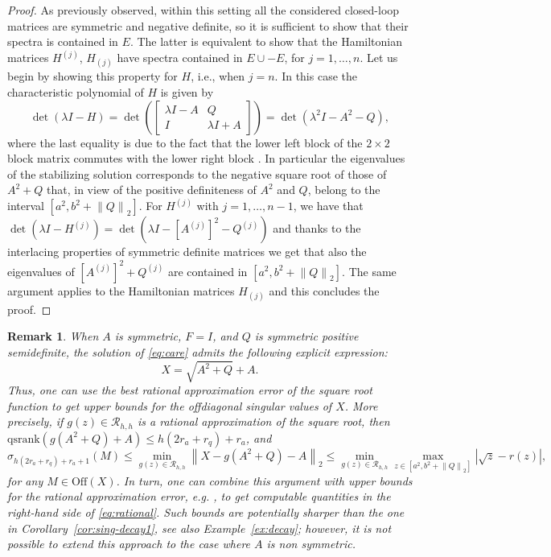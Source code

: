 \documentclass[a4paper,10pt]{article}
\def\qsrank{\mathrm{qsrank}}
\newcommand{\norm}[1]{\left\lVert#1\right\rVert}
\newtheorem{remark}{Remark}
\newcommand{\upd}[1]{{\color{black}#1}} %
\begin{document}
\begin{proof}
	As previously observed, within this setting all the considered closed-loop matrices are symmetric and negative definite, so it is sufficient to show that their spectra is contained in $E$. The latter is equivalent to show that the Hamiltonian matrices $H^{(j)}$, $H_{(j)}$ have spectra contained in $E\cup -E$, for $j=1,\dots, n$. Let us begin by showing this property for $H$, i.e., when $j=n$. In this case the characteristic polynomial of $H$ is given by
	$$
	\det(\lambda I -H)= \det\left(\begin{bmatrix}
		\lambda I - A&Q\\
		I &\lambda I +A
	\end{bmatrix}\right) = \det(\lambda^2 I -A^2-Q),
	$$
	where the last equality is due to the fact that the lower left block of the $2\times 2$ block matrix commutes with the lower right block \cite{silvester2000determinants}. In particular the eigenvalues of the stabilizing solution corresponds to the negative square root of those of $A^2 + Q$ that, in view of the positive definiteness of $A^2$ and $Q$, belong to the interval $[a^2 , b^2 + \norm{Q}_2]$. For $H^{(j)}$ with $j=1,\dots, n-1$, we have that $\det (\lambda I-H^{(j)})= \det(\lambda I- [A^{(j)}]^2-Q^{(j)})$ and thanks to the interlacing properties of symmetric definite matrices we get that also the eigenvalues of 
	$[A^{(j)}]^2+Q^{(j)}$ are contained in $[a^2 , b^2 + \norm{Q}_2]$. The same argument applies to the Hamiltonian matrices $H_{(j)}$ and this concludes the proof.
\end{proof}
\begin{remark}\label{rem:rational}
 When $A$ is symmetric, $F=I$, and $Q$ is symmetric positive semidefinite, the solution of \eqref{eq:care} admits the following explicit expression:
 \begin{equation}\label{eq:caresol}
 	X = \sqrt{A^2+Q}+A.	
 \end{equation} 
Thus, one can use the best rational approximation error of the square root function to get upper bounds for the offdiagonal singular values of $X$. More precisely\upd{,} if $g(z)\in\mathcal R_{h,h}$ is a rational approximation of the square root, then $\qsrank(g(A^2+Q)+A)\le h(2r_a+r_q)+r_a$, and  
\begin{equation}\label{eq:rational}
\sigma_{h(2r_a+r_q)+r_a+1}(M)\le \min_{g(z)\in\mathcal R_{h,h}}\norm{X-g(A^2+Q)-A}_2\le \min_{g(z)\in\mathcal R_{h,h}}\max_{z\in[a^2, b^2+\norm{Q}_2]}|\sqrt{z}-r(z)|,
\end{equation}
for any $M\in \mathrm{Off}(X)$. In turn, one can \upd{combine} this argument with upper bounds for the rational approximation error, e.g. \cite[Equation (27)]{gawlik}, to get computable quantities in the right-hand side of \eqref{eq:rational}. Such bounds are potentially sharper than the one in Corollary~\ref{cor:sing-decay1}, see also Example~\ref{ex:decay}; however, it is not possible to extend this approach to the case where $A$ is non symmetric.
\end{remark}
\end{document}
